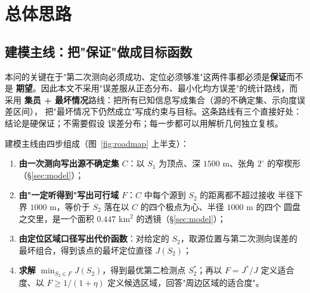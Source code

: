 \section{总体思路}

\subsection{建模主线：把"保证"做成目标函数}

本问的关键在于"第二次测向必须成功、定位必须够准"这两件事都必须是\textbf{保证}而不是
\textbf{期望}。因此本文不采用"误差服从正态分布、最小化均方误差"的统计路线，而采用
\textbf{集员 + 最坏情况}路线：把所有已知信息写成集合（源的不确定集、示向度误差区间），
把"最坏情况下仍然成立"写成约束与目标。这条路线有三个直接好处：结论是硬保证；不需要假设
误差分布；每一步都可以用解析几何独立复核。

建模主线由四步组成（图~\ref{fig:roadmap} 上半支）：

\begin{enumerate}
  \item \textbf{由一次测向写出源不确定集} $C$：以 $S_1$ 为顶点、深 $1500$ m、张角
        $2^\circ$ 的窄楔形（§\ref{sec:model}）；
  \item \textbf{由"一定听得到"写出可行域} $F$：$C$ 中每个源到 $S_2$ 的距离都不超过接收
        半径下界 $1000$ m，等价于 $S_2$ 落在以 $C$ 的四个极点为心、半径 $1000$ m 的四个
        圆盘之交里，是一个面积 $0.447$ km$^2$ 的透镜（§\ref{sec:model}）；
  \item \textbf{由定位区域口径写出代价函数}：对给定的 $S_2$，取源位置与第二次测向误差的
        最坏组合，得到该点的最坏定位直径 $J(S_2)$；
  \item \textbf{求解} $\min_{S_2\in F}J(S_2)$，得到最优第二检测点 $S_2^*$；再以
        $F=J^*/J$ 定义适合度、以 $F\ge1/(1+\eta)$ 定义候选区域，回答"周边区域的适合度"。
\end{enumerate}

